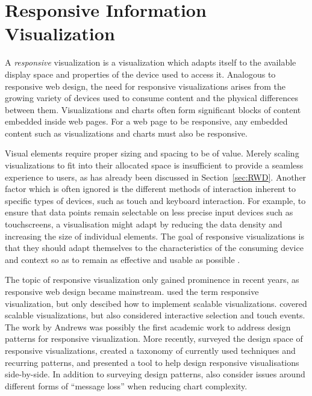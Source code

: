 
\chapter{Responsive Information Visualization}
\label{chap:ResponsiveInformationVisualization}

A \emph{responsive} visualization is a visualization which adapts
itself to the available display space and properties of the device
used to access it. Analogous to responsive web design, the need for
responsive visualizations arises from the growing variety of devices
used to consume content and the physical differences between them.
Visualizations and charts often form significant blocks of content
embedded inside web pages. For a web page to be responsive, any
embedded content such as visualizations and charts must also be
responsive.

Visual elements require proper sizing and spacing to be of
value. Merely scaling visualizations to fit into their allocated space
is insufficient to provide a seamless experience to users, as has
already been discussed in Section~\ref{sec:RWD}. Another factor which
is often ignored is the different methods of interaction inherent to
specific types of devices, such as touch and keyboard interaction. For
example, to ensure that data points remain selectable on less precise
input devices such as touchscreens, a visualisation might adapt by
reducing the data density and increasing the size of individual
elements. The goal of responsive visualizations is that they should
adapt themselves to the characteristics of the consuming device and
context so as to remain as effective and usable as possible
\parencite{DesignPatternsTradeOffsRespVis}.


The topic of responsive visualization only gained prominence in recent
years, as responsive web design became mainstream.
\textcite{BuildingRespDataVisForTheWeb} used the term responsive
visualization, but only descibed how to implement scalable
visualizations. \textcite{LearningRespDataVis} covered scalable
visualizations, but also considered interactive selection and touch
events. The work by Andrews
\parencite{RespVisTalk,RespVisPage,RespVis} was possibly the first
academic work to address design patterns for responsive visualization.
%
More recently, \parencite{TechniquesForFlexibleRespVisDesign} surveyed
the design space of responsive visualizations, created a taxonomy of
currently used techniques and recurring patterns, and presented a tool
to help design responsive visualisations side-by-side. In addition to
surveying design patterns, \textcite{DesignPatternsTradeOffsRespVis}
also consider issues around different forms of \enquote{message loss}
when reducing chart complexity.





